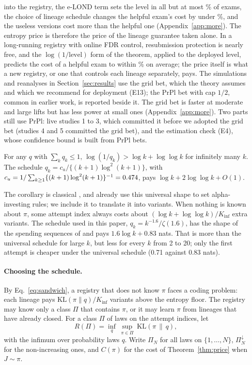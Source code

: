 into the registry, the e-LOND term sets the level in all but at most \NLcBindMax\% of exams, the choice of lineage schedule changes the helpful exam's cost by under \NLcSchedSpread\%, and the useless versions cost more than the helpful one (Appendix~\ref{app:more}). The entropy price is therefore the price of the lineage guarantee taken alone. In a long-running registry with online FDR control, resubmission protection is nearly free, and the $\log(1/\text{level})$ form of the theorem, applied to the deployed level, predicts the cost of a helpful exam to within \NLcPredErrMean\% on average; the price itself is what a new registry, or one that controls each lineage separately, pays. The simulations and reanalyses in Section~\ref{sec:results} use the grid bet, which the theory assumes and which we recommend for deployment (E13); the PrPl bet with cap $1/2$, common in earlier work, is reported beside it. The grid bet is faster at moderate and large lifts but has less power at small ones (Appendix~\ref{app:more}). Two parts still use PrPl: live studies 1 to 3, which committed it before we adopted the grid bet (studies 4 and 5 committed the grid bet), and the estimation check (E4), whose confidence bound is built from PrPl bets.

\begin{corollary}\label{cor:universal}
For any $q$ with $\sum_kq_k\le1$, $\log(1/q_k)>\log k+\log\log k$ for infinitely many $k$. The schedule $q_k=c_u/\{(k+1)\log^2(k+1)\}$, with $c_u=1/\sum_{k\ge1}\{(k+1)\log^2(k+1)\}^{-1}=0.474$, pays $\log k+2\log\log k+O(1)$.
\end{corollary}
The corollary is classical \citep{elias1975universal,rissanen1983universal}, and \citet{foster2013risk} already use this universal shape to set alpha-investing rules; we include it to translate it into variants.
When nothing is known about $\pi$, some attempt index always costs about $(\log k+\log\log k)/K_{\inf}$ extra variants. The schedule used in this paper, $q_k=k^{-1.6}/\zeta(1.6)$, has the shape of the spending sequences of \citet{howard2021timeuniform} and pays $1.6\log k+0.83$ nats. That is more than the universal schedule for large $k$, but less for every $k$ from 2 to 20; only the first attempt is cheaper under the universal schedule (0.71 against 0.83 nats).

\paragraph{Choosing the schedule.} By Eq.~\eqref{eq:sandwich}, a registry that does not know $\pi$ faces a coding problem: each lineage pays $\mathrm{KL}(\pi\|q)/K_{\inf}$ variants above the entropy floor. The registry may know only a class $\Pi$ that contains $\pi$, or it may learn $\pi$ from lineages that have already closed. For a class $\Pi$ of laws on the attempt indices, let
\[
R(\Pi)=\inf_q\ \sup_{\pi\in\Pi}\ \mathrm{KL}(\pi\,\|\,q),
\]
with the infimum over probability laws $q$. Write $\Pi_N$ for all laws on $\{1,\dots,N\}$, $\Pi_N^{\downarrow}$ for the non-increasing ones, and $C(\pi)$ for the cost of Theorem~\ref{thm:price} when $J\sim\pi$.

